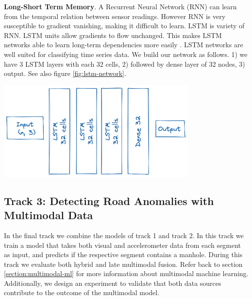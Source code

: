 \begin{minipage}{\textwidth}
\textbf{Long-Short Term Memory}. A Recurrent Neural Network (RNN) can learn from the temporal relation between sensor readings. However RNN is very susceptible to gradient vanishing, making it difficult to learn. LSTM is variety of RNN. LSTM units allow gradients to flow unchanged. This makes LSTM networks able to learn long-term dependencies more easily \cite{Goodfellow2016}. LSTM networks are well suited for classifying time series data. We build our network as follows. 1) we have 3 LSTM layers with each 32 cells, 2) followed by dense layer of 32 nodes, 3) output. See also figure \ref{fig:lstm-network}.
\baselineskip

\begin{center}
\includegraphics[height=5cm]{images/5_multimodal_fusion/lstm-network-2.png}
\captionsetup{width=0.90\textwidth}
\label{fig:lstm-network}
\end{center}
\end{minipage}


\subsection{Track 3: Detecting Road Anomalies with Multimodal Data}
\label{sec:track-3-design}

In the final track we combine the models of track 1 and track 2. In this track we train a model that takes both visual and accelerometer data from each segment as input, and predicts if the respective segment contains a manhole. During this track we evaluate both hybrid and late multimodal fusion. Refer back to section \ref{section:multimodal-ml} for more information about multimodal machine learning. Additionally, we design an experiment to validate that both data sources contribute to the outcome of the multimodal model.

